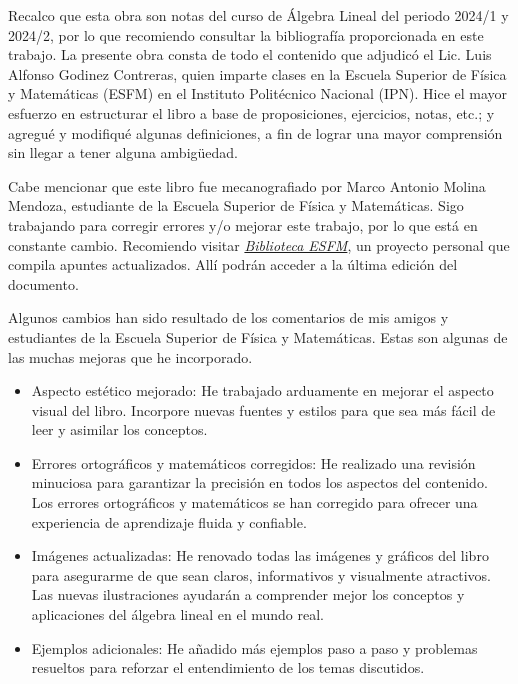 Recalco que esta obra son notas del curso de Álgebra Lineal del periodo 2024/1 y 2024/2, por lo que recomiendo consultar la bibliografía proporcionada en este trabajo. La presente obra consta de todo el contenido que adjudicó el Lic. Luis Alfonso Godinez Contreras, quien imparte clases en la Escuela Superior de Física y Matemáticas (ESFM) en el Instituto Politécnico Nacional (IPN). Hice el mayor esfuerzo en estructurar el libro a base de proposiciones, ejercicios, notas, etc.; y agregué y modifiqué algunas definiciones, a fin de lograr una mayor comprensión sin llegar a tener alguna ambigüedad.

Cabe mencionar que este libro fue mecanografiado por Marco Antonio Molina Mendoza, estudiante de la Escuela Superior de Física y Matemáticas. Sigo trabajando para corregir errores y/o mejorar este trabajo, por lo que está en constante cambio. Recomiendo visitar \href{https://linktr.ee/biblioteca_esfm}{\emph{Biblioteca ESFM}}, un proyecto personal que compila apuntes actualizados. Allí podrán acceder a la última edición del documento.

\newpage
Algunos cambios han sido resultado de los comentarios de mis amigos y estudiantes de la Escuela Superior de Física y Matemáticas. Estas son algunas de las muchas mejoras que he incorporado.
\begin{itemize}
    \item Aspecto estético mejorado: He trabajado arduamente en mejorar el aspecto visual del libro. Incorpore nuevas fuentes y estilos para que sea más fácil de leer y asimilar los conceptos.
    \item Errores ortográficos y matemáticos corregidos: He realizado una revisión minuciosa para garantizar la precisión en todos los aspectos del contenido. Los errores ortográficos y matemáticos se han corregido para ofrecer una experiencia de aprendizaje fluida y confiable.
    \item Imágenes actualizadas: He renovado todas las imágenes y gráficos del libro para asegurarme de que sean claros, informativos y visualmente atractivos. Las nuevas ilustraciones ayudarán a comprender mejor los conceptos y aplicaciones del álgebra lineal en el mundo real.
    \item Ejemplos adicionales: He añadido más ejemplos paso a paso y problemas resueltos para reforzar el entendimiento de los temas discutidos.
\end{itemize}


